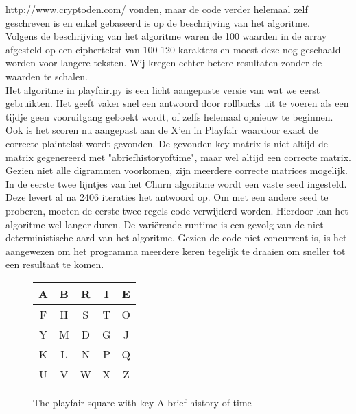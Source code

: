 \url{http://www.cryptoden.com/} vonden, maar de code verder helemaal zelf geschreven is en enkel gebaseerd is op de beschrijving van het algoritme. \\
Volgens de beschrijving van het algoritme waren de 100 waarden in de array afgesteld op een ciphertekst van 100-120 karakters en moest deze nog geschaald worden voor langere teksten. Wij kregen echter betere resultaten zonder de waarden te schalen. \\
Het algoritme in playfair.py is een licht aangepaste versie van wat we eerst gebruikten. Het geeft vaker snel een antwoord door rollbacks uit te voeren als een tijdje geen vooruitgang geboekt wordt, of zelfs helemaal opnieuw te beginnen. Ook is het scoren nu aangepast aan de X'en in Playfair waardoor exact de correcte plaintekst wordt gevonden. De gevonden key matrix is niet altijd de matrix gegenereerd met "abriefhistoryoftime", maar wel altijd een correcte matrix. Gezien niet alle digrammen voorkomen, zijn meerdere correcte matrices mogelijk. \\
In de eerste twee lijntjes van het Churn algoritme wordt een vaste seed ingesteld. Deze levert al na 2406 iteraties het antwoord op. Om met een andere seed te proberen, moeten de eerste twee regels code verwijderd worden. Hierdoor kan het algoritme wel langer duren. De vari\"erende runtime is een gevolg van de niet-deterministische aard van het algoritme. Gezien de code niet concurrent is, is het aangewezen om het programma meerdere keren tegelijk te draaien om sneller tot een resultaat te komen.

\begin{figure} [h!]
\centering
\begin{tabular}{c|c|c|c|c}
A&B&R&I&E\\ \hline
F&H&S&T&O\\ \hline
Y&M&D&G&J\\ \hline
K&L&N&P&Q\\ \hline
U&V&W&X&Z\\
\end{tabular}
\caption{The playfair square with key A brief history of time}
\end{figure}

